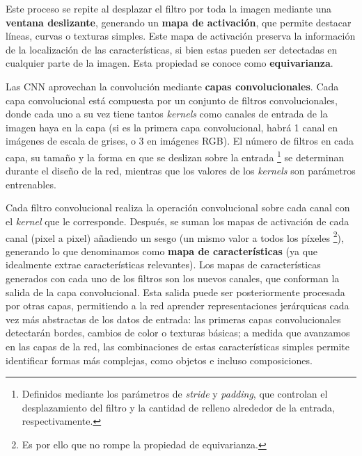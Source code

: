 Este proceso se repite al desplazar el filtro por toda la imagen mediante una \textbf{ventana deslizante}, 
generando un \textbf{mapa de activación}, que permite destacar líneas, curvas o texturas simples. Este mapa de
activación preserva la información de la localización de las características, si bien estas pueden ser 
detectadas en cualquier parte de la imagen. Esta propiedad se conoce como \textbf{equivarianza}. 

Las \acrshort{CNN} aprovechan la convolución mediante \textbf{capas convolucionales}. Cada capa convolucional está
compuesta por un conjunto de filtros convolucionales, donde cada uno a su vez tiene tantos \textit{kernels} 
como canales de entrada de la imagen haya en la capa (si es la primera capa convolucional, habrá 1 canal en 
imágenes de escala de grises, o 3 en imágenes RGB). El número de filtros en cada capa, su tamaño y la forma
en que se deslizan sobre la entrada%
\footnote{                                                                      
    Definidos mediante los parámetros de \textit{stride} y \textit{padding}, que controlan el desplazamiento       
    del filtro y la cantidad de relleno alrededor de la entrada, respectivamente.
}
se determinan durante el diseño de la red, mientras que los valores de los \textit{kernels} son parámetros 
entrenables.

Cada filtro convolucional realiza la operación convolucional sobre cada canal con el \textit{kernel} que le 
corresponde. Después, se suman los mapas de activación de cada canal (pixel a pixel) añadiendo un sesgo 
(un mismo valor a todos los píxeles%
\footnote{
    Es por ello que no rompe la propiedad de equivarianza.
}),
generando lo que denominamos como \textbf{mapa de características} (ya que idealmente extrae 
características relevantes). Los mapas de características generados con cada uno de los filtros son los nuevos 
canales, que conforman la salida de la capa convolucional. Esta salida puede ser posteriormente procesada por 
otras capas, permitiendo a la red aprender representaciones jerárquicas cada vez más abstractas de los datos 
de entrada: las primeras capas convolucionales detectarán bordes, cambios de color o texturas básicas; a 
medida que avanzamos en las capas de la red, las combinaciones de estas características simples permite 
identificar formas más complejas, como objetos e incluso composiciones.

